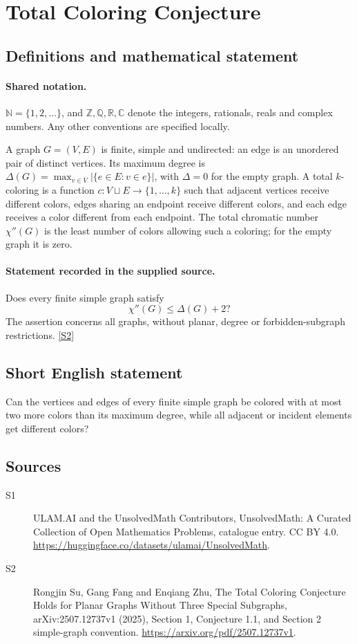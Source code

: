 \documentclass[11pt]{article}
\newcommand{\sref}[2]{\hyperlink{source:#1:#2}{[S#2]}}
\begin{document}
\section{Total Coloring Conjecture}\label{statement}

\subsection{Definitions and mathematical statement}

\paragraph{Shared notation.}$\mathbb N=\{1,2,\ldots\}$, and $\mathbb Z,\mathbb Q,\mathbb R,\mathbb C$ denote the integers, rationals, reals and complex numbers. Any other conventions are specified locally.


A graph $G=(V,E)$ is finite, simple and undirected: an edge is an unordered pair of distinct vertices. Its maximum degree is $\Delta(G)=\max_{v\in V}|\{e\in E:v\in e\}|$, with $\Delta=0$ for the empty graph. A total $k$-coloring is a function $c:V\sqcup E\to\{1,\ldots,k\}$ such that adjacent vertices receive different colors, edges sharing an endpoint receive different colors, and each edge receives a color different from each endpoint. The total chromatic number $\chi''(G)$ is the least number of colors allowing such a coloring; for the empty graph it is zero.
\paragraph{Statement recorded in the supplied source.}
Does every finite simple graph satisfy
\[
 \chi''(G)\le \Delta(G)+2?
\]
The assertion concerns all graphs, without planar, degree or forbidden-subgraph restrictions. \sref{statement}{2}
\subsection{Short English statement}
Can the vertices and edges of every finite simple graph be colored with at most two more colors than its maximum degree, while all adjacent or incident elements get different colors?
\subsection{Sources}
\begin{description}
\item[\hypertarget{source:statement:1}{S1}] ULAM.AI and the UnsolvedMath Contributors, UnsolvedMath: A Curated Collection of Open Mathematics Problems, catalogue entry. CC BY 4.0. \url{https://huggingface.co/datasets/ulamai/UnsolvedMath}.
\item[\hypertarget{source:statement:2}{S2}] Rongjin Su, Gang Fang and Enqiang Zhu, The Total Coloring Conjecture Holds for Planar Graphs Without Three Special Subgraphs, arXiv:2507.12737v1 (2025), Section 1, Conjecture 1.1, and Section 2 simple-graph convention. \url{https://arxiv.org/pdf/2507.12737v1}.
\end{description}
\label{end:statement}
\end{document}
